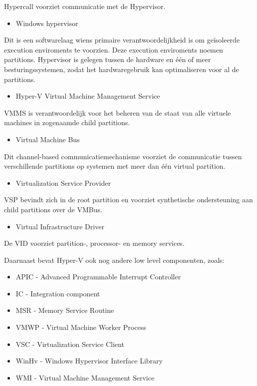Hypercall voorziet communicatie met de Hypervisor.

\begin{itemize}[noitemsep]
	\item Windows hypervisor
\end{itemize}

Dit is een softwarelaag wiens primaire verantwoordelijkheid is om geïsoleerde execution enviroments te voorzien. Deze execution enviroments noemen partitions. Hypervisor is gelegen tussen de hardware en één of meer besturingssystemen, zodat het hardwaregebruik kan optimaliseren voor al de partitions.

\begin{itemize}[noitemsep]
	\item Hyper-V Virtual Machine Management Service
\end{itemize}

VMMS is verantwoordelijk voor het beheren van de staat van alle virtuele machines in zogenaamde child partitions.

\begin{itemize}[noitemsep]
	\item Virtual Machine Bus
\end{itemize}

Dit channel-based communicatiemechanisme voorziet de communicatie tussen verschillende partitions op systemen met meer dan één virtual partition.

\begin{itemize}[noitemsep]
	\item Virtualization Service Provider
\end{itemize}

VSP bevindt zich in de root partition en voorziet synthetische ondersteuning aan child partitions over de VMBus.

\begin{itemize}[noitemsep]
	\item Virtual Infrastructure Driver
\end{itemize}

De VID voorziet partition-, processor- en memory services.

Daarnaast bevat Hyper-V ook nog andere low level componenten, zoals:

\begin{itemize}[noitemsep]
	\item APIC - Advanced Programmable Interrupt Controller
	\item IC - Integration component
	\item MSR - Memory Service Routine
	\item VMWP - Virtual Machine Worker Process 
	\item VSC - Virtualization Service Client
	\item WinHv  - Windows Hypervisor Interface Library 
	\item WMI - Virtual Machine Management Service 
\end{itemize}

